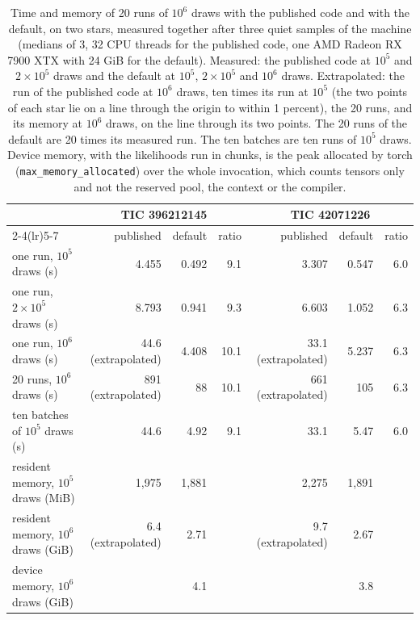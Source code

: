 \documentclass[11pt]{article}
\begin{document}
\begin{table}[ht]
\centering
\caption{Time and memory of 20 runs of $10^{6}$ draws with the published code and with the default, on two stars, measured together after three quiet samples of the machine (medians of 3, 32 CPU threads for the published code, one AMD Radeon RX 7900 XTX with 24 GiB for the default). Measured: the published code at $10^{5}$ and $2\times10^{5}$ draws and the default at $10^{5}$, $2\times10^{5}$ and $10^{6}$ draws. Extrapolated: the run of the published code at $10^{6}$ draws, ten times its run at $10^{5}$ (the two points of each star lie on a line through the origin to within 1 percent), the 20 runs, and its memory at $10^{6}$ draws, on the line through its two points. The 20 runs of the default are 20 times its measured run. The ten batches are ten runs of $10^{5}$ draws. Device memory, with the likelihoods run in chunks, is the peak allocated by torch (\texttt{max\_memory\_allocated}) over the whole invocation, which counts tensors only and not the reserved pool, the context or the compiler.}\label{tab:cost}
\footnotesize\setlength{\tabcolsep}{4.5pt}
\begin{tabular}{lrrrrrr}
\toprule
 & \multicolumn{3}{c}{TIC 396212145} & \multicolumn{3}{c}{TIC 42071226} \\
\cmidrule(lr){2-4}\cmidrule(lr){5-7}
 & published & default & ratio & published & default & ratio \\
\midrule
one run, $10^{5}$ draws (s) & 4.455 & 0.492 & 9.1 & 3.307 & 0.547 & 6.0 \\
one run, $2\times10^{5}$ draws (s) & 8.793 & 0.941 & 9.3 & 6.603 & 1.052 & 6.3 \\
one run, $10^{6}$ draws (s) & 44.6 (extrapolated) & 4.408 & 10.1 & 33.1 (extrapolated) & 5.237 & 6.3 \\
20 runs, $10^{6}$ draws (s) & 891 (extrapolated) & 88 & 10.1 & 661 (extrapolated) & 105 & 6.3 \\
ten batches of $10^{5}$ draws (s) & 44.6 & 4.92 & 9.1 & 33.1 & 5.47 & 6.0 \\
resident memory, $10^{5}$ draws (MiB) & 1,975 & 1,881 & & 2,275 & 1,891 & \\
resident memory, $10^{6}$ draws (GiB) & 6.4 (extrapolated) & 2.71 & & 9.7 (extrapolated) & 2.67 & \\
device memory, $10^{6}$ draws (GiB) & & 4.1 & & & 3.8 & \\
\bottomrule
\end{tabular}
\end{table}
\end{document}
